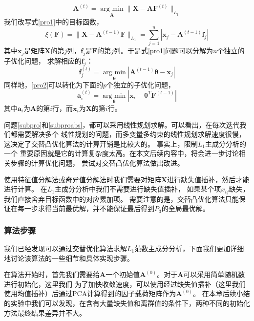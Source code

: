 \begin{equation}\label{pro2}
\bm{A}^{(t)} = \underset{\bm{A}}{\operatorname{arg\ min}} \|\bm X - \bm{A}\bm F^{(t)}\|_{L_1} 
\end{equation}
我们改写式\eqref{pro1}中的目标函数，
\begin{equation}\label{loss-a}
\xi(\bm{F}) = \|\bm{X} - \bm{A}^{(t-1)}\bm{F} \|_{L_1} = \sum_{j=1}^{n}|\bm{x}_j - \bm{A}^{(t-1)}\bm{f}_j| 
\end{equation}
其中$\bm x_j$是矩阵$\bm X$的第$j$列，$\bm f_j$是$\bm{F}$的第$j$列。于是式\eqref{pro1}问题可以分解为$n$个独立的子优化问题，
求解相应的$\bm{f}_j$：
\begin{equation}\label{subpro}
    \bm{f}_j^{(t)} = \underset{\bm{\theta}}{\operatorname{arg\ min}} |\bm{A}^{(t-1)}\bm{\theta} - \bm{x}_j|
\end{equation}
同样地，\eqref{pro2}可以转化为下面的$p$个独立的子优化问题，
\begin{equation}\label{subproabs}
    \bm{a}_i^{(t)} = \underset{\bm{\theta}}{\operatorname{arg\ min}} |\bm{x}_i - \bm \theta^T \bm{F}^{(t-1)}|
\end{equation}
其中$\bm{a}_i$为$\bm{A}$的第$i$行，而$\bm{x}_i$为$\bm{X}$的第$i$行。

问题\eqref{subpro}和\eqref{subproabs}，都可以采用线性规划求解。可以看出，在每次迭代我们都需要解决多个
线性规划的问题，而多变量多约束的线性规划求解速度很慢，这决定了交替凸优化算法的计算开销是比较大的。
事实上，限制$L_1$主成分分析的一个
重要原因就是它的计算复杂度太高。在本文后续内容中，将会进一步讨论相关步骤的计算优化问题，
尝试对交替凸优化算法做出改进。

使用特征值分解法或奇异值分解法时我们需要对矩阵$\bm{X}$进行缺失值插补，然后才能进行计算。
在$L_1$主成分分析中我们不需要进行缺失值插补，
如果某个项$x_{ij}$缺失，我们直接舍弃目标函数中的对应累加项。
需要注意的是，交替凸优化算法只能保证在每一步求得当前最优解，并不能保证最后得到$P_3$的全局最优解。

\subsubsection{算法步骤}
我们已经发现可以通过交替优化算法求解$L_1$范数主成分分析，下面我们更加详细地讨论该算法的一些细节和具体实现步骤。

在算法开始时，首先我们需要给$\bm{A}$一个初始值$\bm{A}^{(0)}$。对于$\bm{A}$可以采用简单随机数进行初始化，这里我们
为了加快收敛速度，可以使用经过缺失值插补（这里我们使用均值插补）后通过PCA计算得到的因子载荷矩阵作为$\bm{A}^{(0)}$。
在本章后续小结的实验中我们可以发现，在含有大量缺失值和离群值的条件下，两种不同的初始化方法最终结果差异并不大。

